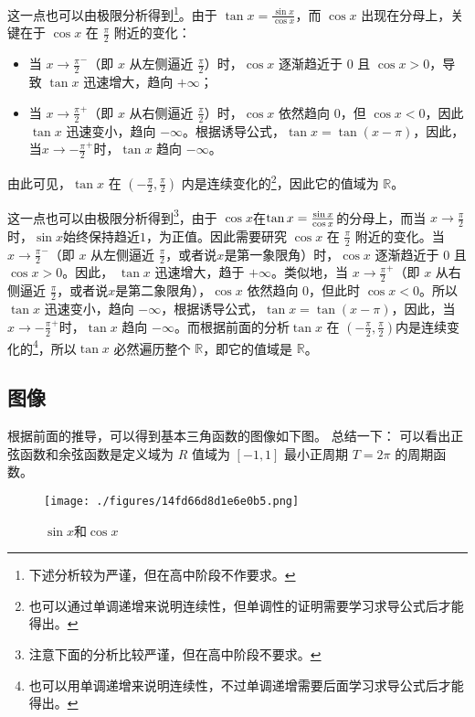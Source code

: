 这一点也可以由极限分析得到\footnote{下述分析较为严谨，但在高中阶段不作要求。}。由于 $\displaystyle\tan x = \frac{\sin x}{\cos x}$，而 $\cos x$ 出现在分母上，关键在于 $\cos x$ 在 $\displaystyle\frac{\pi}{2}$ 附近的变化：
\begin{itemize}
\item 当 $\displaystyle x \to \frac{\pi}{2}^-$（即 $x$ 从左侧逼近 $\frac{\pi}{2}$）时，$\cos x$ 逐渐趋近于 $0$ 且 $\cos x > 0$，导致 $\tan x$ 迅速增大，趋向 $+\infty$；
\item 当 $\displaystyle x \to \frac{\pi}{2}^+$（即 $x$ 从右侧逼近 $\frac{\pi}{2}$）时，$\cos x$ 依然趋向 $0$，但 $\cos x < 0$，因此 $\tan x$ 迅速变小，趋向 $-\infty$。根据诱导公式，$\tan x=\tan(x-\pi)$，因此，当$\displaystyle x \to -\frac{\pi}{2}^+$时，$\tan x$ 趋向 $-\infty$。
\end{itemize}

由此可见，$\tan x$ 在 $\displaystyle (-\frac{\pi}{2},\frac{\pi}{2})$ 内是连续变化的\footnote{也可以通过单调递增来说明连续性，但单调性的证明需要学习求导公式后才能得出。}，因此它的值域为 $\mathbb{R}$。


这一点也可以由极限分析得到\footnote{注意下面的分析比较严谨，但在高中阶段不要求。}，由于 $\cos x$在$\tan x={\sin x\over\cos x}$的分母上，而当 $x \to \frac{\pi}{2}$时，$\sin x $始终保持趋近$1$，为正值。因此需要研究 $\cos x$ 在 $\frac{\pi}{2}$ 附近的变化。当 $x \to \frac{\pi}{2}^-$（即 $x$ 从左侧逼近 $\frac{\pi}{2}$，或者说$x$是第一象限角）时，$\cos x$ 逐渐趋近于 $0$ 且 $\cos x > 0$。因此， $\tan x$ 迅速增大，趋于 $+\infty$。类似地，当 $x \to \frac{\pi}{2}^+$（即 $x$ 从右侧逼近 $\frac{\pi}{2}$，或者说$x$是第二象限角），$\cos x$ 依然趋向 $0$，但此时 $\cos x < 0$。所以 $\tan x$ 迅速变小，趋向 $-\infty$，根据诱导公式，$\tan x=\tan(x-\pi)$，因此，当$x \to -\frac{\pi}{2}^+$时，$\tan x$ 趋向 $-\infty$。而根据前面的分析$\tan x$ 在 $(-\frac{\pi}{2}, \frac{\pi}{2})$内是连续变化的\footnote{也可以用单调递增来说明连续性，不过单调递增需要后面学习求导公式后才能得出。}，所以$\tan x$ 必然遍历整个 $\mathbb{R}$，即它的值域是 $\mathbb{R}$。




\subsection{图像}
根据前面的推导，可以得到基本三角函数的图像如下图。
总结一下：
可以看出正弦函数和余弦函数是定义域为 $R$ 值域为 $[-1,1]$ 最小正周期 $T = 2\pi$ 的周期函数。

\begin{figure}[ht]
\centering
\texttt{[image: ./figures/14fd66d8d1e6e0b5.png]}
\caption{$\sin x$和$\cos x$} \label{fig_HsTFFv_1}
\end{figure}

